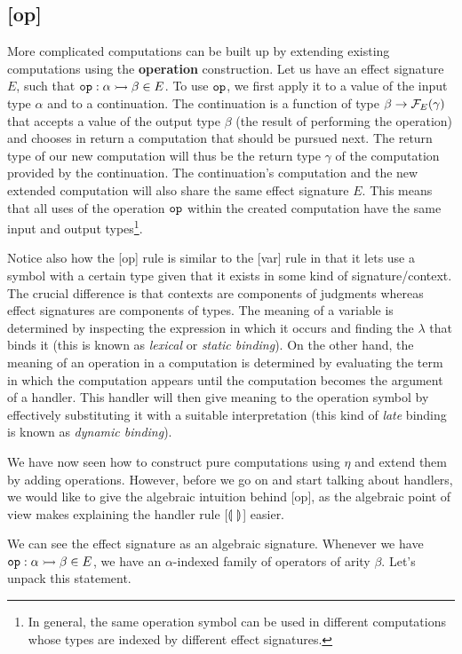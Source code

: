 \subsection*{[op]}

More complicated computations can be built up by extending existing
computations using the \textbf{operation} construction. Let us have an
effect signature $E$, such that $\mathtt{op} : \alpha \rightarrowtail \beta \in E$. To use
$\mathtt{op}$, we first apply it to a value of the input type $\alpha$ and to a
continuation. The continuation is a function of type $\beta \to
\mathcal{F}_E(\gamma)$ that accepts a value of the output type $\beta$ (the result
of performing the operation) and chooses in return a computation that
should be pursued next. The return type of our new computation will thus be
the return type $\gamma$ of the computation provided by the
continuation. The continuation's computation and the new extended
computation will also share the same effect signature $E$. This means that
all uses of the operation $\mathtt{op}$ within the created computation have the
same input and output types\footnote{In general, the same operation symbol
  can be used in different computations whose types are indexed by
  different effect signatures.}.

Notice also how the [op] rule is similar to the [var] rule in that it lets
use a symbol with a certain type given that it exists in some kind of
signature/context. The crucial difference is that contexts are components
of judgments whereas effect signatures are components of types. The meaning
of a variable is determined by inspecting the expression in which it occurs
and finding the $\lambda$ that binds it (this is known as \emph{lexical} or
\emph{static binding}). On the other hand, the meaning of an operation in a
computation is determined by evaluating the term in which the computation
appears until the computation becomes the argument of a handler. This
handler will then give meaning to the operation symbol by effectively
substituting it with a suitable interpretation (this kind of \emph{late}
binding is known as \emph{dynamic binding}).

We have now seen how to construct pure computations using $\eta$ and extend
them by adding operations. However, before we go on and start talking about
handlers, we would like to give the algebraic intuition behind [op], as the
algebraic point of view makes explaining the handler rule [$\llparenthesis \,  \, \rrparenthesis$]
easier.

We can see the effect signature as an algebraic signature. Whenever we have
$\mathtt{op} : \alpha \rightarrowtail \beta \in E$, we have an $\alpha$-indexed family of
operators of arity $\beta$. Let's unpack this statement.

